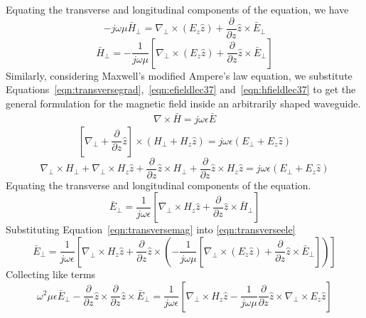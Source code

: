 Equating the transverse and longitudinal components of the equation, we have
\begin{dmath*}
-j\omega\mu\bar{H}_\bot = \nabla_\bot\times(E_z\hat{z}) + \frac{\partial}{\partial z}\hat{z}\times\bar{E}_\bot
\end{dmath*}
\begin{dmath}
\bar{H}_\bot = -\frac{1}{j\omega\mu} \left[\nabla_\bot\times(E_z\hat{z}) + \frac{\partial}{\partial z}\hat{z}\times\bar{E}_\bot\right]
\label{eqn:transversemag}
\end{dmath}
Similarly, considering Maxwell's modified Ampere's law equation, we substitute Equations~\ref{eqn:transversegrad},~\ref{eqn:efieldlec37} and~\ref{eqn:hfieldlec37} to get the general formulation for the magnetic field inside an arbitrarily shaped waveguide.
\begin{align*}
\nabla\times\bar{H} = j\omega\epsilon\bar{E}
\end{align*}
\begin{dmath*}
\left[ \nabla_\bot + \frac{\partial}{\partial z}\hat{z} \right] \times (H_\bot + H_z \hat{z}) = j \omega\epsilon (E_\bot + E_z \hat{z})
\end{dmath*}
\begin{dmath*}
\nabla_\bot\times H_\bot + \nabla_\bot\times H_z \hat{z} +  \frac{\partial}{\partial z}\hat{z}\times H_\bot + \frac{\partial}{\partial z}\hat{z}\times H_z \hat{z} = j \omega\epsilon (E_\bot + E_z \hat{z})
\end{dmath*}
Equating the transverse and longitudinal components of the equation.
\begin{dmath}
\bar{E}_\bot = \frac{1}{j\omega\epsilon} \left[\nabla_\bot\times H_z\hat{z} + \frac{\partial}{\partial z}\hat{z}\times\bar{H}_\bot\right]
\label{eqn:transverseele}
\end{dmath}
Substituting Equation~\ref{eqn:transversemag} into \ref{eqn:transverseele}
\begin{dmath*}
\bar{E}_\bot = \frac{1}{j\omega\epsilon} \left[\nabla_\bot\times H_z\hat{z} + \frac{\partial}{\partial z}\hat{z}\times \left( -\frac{1}{j\omega\mu} \left[\nabla_\bot\times(E_z\hat{z}) + \frac{\partial}{\partial z}\hat{z}\times\bar{E}_\bot\right] \right)\right] 
\end{dmath*}
Collecting like terms
\begin{dmath}
\omega^2\mu\epsilon\bar{E}_\bot-\frac{\partial}{\partial z}\hat{z}\times\frac{\partial}{\partial z}\hat{z}\times\bar{E}_\bot = \frac{1}{j\omega\epsilon} \left[\nabla_\bot\times H_z\hat{z} - \frac{1}{j\omega\mu}\frac{\partial}{\partial z}\hat{z}\times\nabla_\bot\times E_z \hat{z} \right]
\label{eqn:electricfieldinwg}
\end{dmath}

